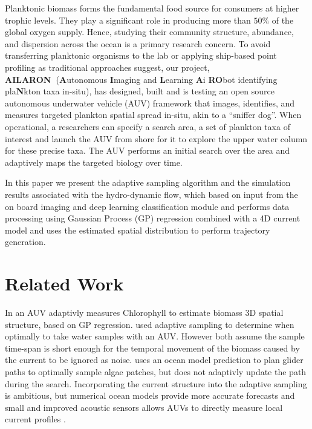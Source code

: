 \documentclass[conference]{IEEEtran}
\def\proj{{\textbf{AILARON\ }}}
\begin{document}
Planktonic biomass forms the fundamental food source for consumers at
higher trophic levels. They play a significant role in producing more
than $50\%$ of the global oxygen supply. Hence, studying their
community structure, abundance, and dispersion across the ocean is a
primary research concern. To avoid transferring planktonic organisms
to the lab or applying ship-based point profiling as traditional
approaches suggest, our project, \proj (\textbf{A}utonomous
\textbf{I}maging and \textbf{L}earning \textbf{A}i \textbf{RO}bot
identifying pla\textbf{N}kton taxa in-situ), has designed, built and
is testing an open source autonomous underwater vehicle (AUV)
framework that images, identifies, and measures targeted plankton
spatial spread in-situ, akin to a ``sniffer dog''. When operational, a
researchers can specify a search area, a set of plankton taxa of
interest and launch the AUV from shore for it to explore the upper
water column for these precise taxa. The AUV performs an initial
search over the area and adaptively maps the targeted biology over
time. %

In this paper we present the adaptive sampling algorithm and the
simulation results associated with the hydro-dynamic flow, which based
on input from the on board imaging and deep learning classification
module and performs data processing using Gaussian Process (GP)
regression combined with a 4D current model and uses the estimated
spatial distribution to perform trajectory generation. 


\section{Related Work}

In \cite{fossum18b} an AUV adaptivly measures Chlorophyll to estimate
biomass 3D spatial structure, based on GP regression. \cite{das15}
used adaptive sampling to determine when optimally to take water
samples with an AUV.  However both assume the sample time-span is
short enough for the temporal movement of the biomass caused by the
current to be ignored as noise.  \cite{smith10} uses an ocean model
prediction to plan glider paths to optimally sample algae patches, but
does not adaptivly update the path during the search.  Incorporating
the current structure into the adaptive sampling is ambitious, but
numerical ocean models provide more accurate forecasts and small and
improved acoustic sensors allows AUVs to directly measure local
current profiles \cite{Fong2006, Cusi2017}.
\end{document}
